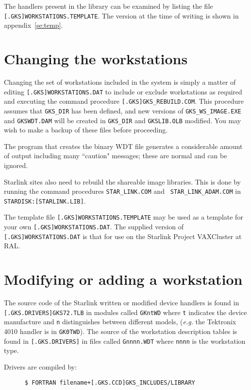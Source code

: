 The handlers present in the library can be examined by listing the file
{\tt [.GKS]WORKSTATIONS\-.TEMPLATE}. The version at the time of writing is
shown in appendix~\ref{se:temp}.

\section{Changing the workstations}

Changing the set of workstations included in the system is simply a matter of
editing {\tt [.GKS]\-WORKSTATIONS.DAT} to include or exclude workstations as
required and executing the command procedure {\tt [.GKS]GKS\_REBUILD.COM}. This
procedure assumes that {\tt GKS\_DIR} has been defined, and new versions of
{\tt GKS\_WS\_IMAGE.EXE} and {\tt GKSWDT.DAM} will be created in {\tt GKS\_DIR}
and {\tt GKSLIB.OLB} modified. You may wish to make a backup of these files
before proceeding.

The program that creates the binary WDT file generates a considerable amount
of output including many ``caution" messages; these are normal and can be
ignored.

Starlink sites also need to rebuild the shareable image libraries. This is done
by running the command procedures {\tt STAR\_LINK.COM} and {\tt
STAR\_LINK\_ADAM.COM} in {\tt STARDISK:[STARLINK.LIB]}.

The template file {\tt [.GKS]WORKSTATIONS\-.TEMPLATE} may be used as a template
for your own {\tt [.GKS]\-WORKSTATIONS.DAT}. The supplied version of {\tt
[.GKS]\-WORKSTATIONS.DAT} is that for use on the Starlink Project VAXCluster 
at RAL.


\section{Modifying or adding a workstation}

The source code of the Starlink written or modified device handlers is found in
{\tt [.GKS.DRIVERS]\-GKS72.TLB} in modules called {\tt GKntWD} where {\tt t}
indicates the device manufacture and {\tt n} distinguishes between different
models, ({\em e.g.} the Tektronix 4010 handler is in {\tt GK0TWD}). The source
of the workstation description tables is found in {\tt [.GKS.DRIVERS]} in files
called {\tt Gnnnn.WDT} where {\tt nnnn} is the workstation type.

Drivers are compiled by:

\begin{verbatim}
      $ FORTRAN filename+[.GKS.CCD]GKS_INCLUDES/LIBRARY
\end{verbatim}

